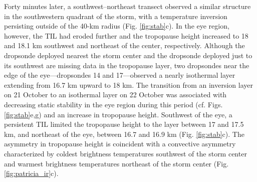 Forty minutes later, a southwest–northeast transect observed a similar structure in the southwestern quadrant of the storm, with a temperature inversion persisting outside of the 40-km radius (Fig. \ref{fig:stab}c).
In the eye region, however, the TIL had eroded further and the tropopause height increased to 18 and 18.1 km southwest and northeast of the center, respectively.
Although the dropsonde deployed nearest the storm center and the dropsonde deployed just to its southwest are missing data in the tropopause layer, two dropsondes near the edge of the eye---dropsondes 14 and 17---observed a nearly isothermal layer extending from 16.7 km upward to 18 km.
The transition from an inversion layer on 21 October to an isothermal layer on 22 October was associated with decreasing static stability in the eye region during this period (cf. Figs. \ref{fig:stab}e,g) and an increase in tropopause height.
Southwest of the eye, a persistent TIL limited the tropopause height to the layer between 17 and 17.5 km, and northeast of the eye, between 16.7 and 16.9 km (Fig. \ref{fig:stab}c).
The asymmetry in tropopause height is coincident with a convective asymmetry characterized by coldest brightness temperatures southwest of the storm center and warmest brightness temperatures northeast of the storm center (Fig. \ref{fig:patricia_ir}c).


